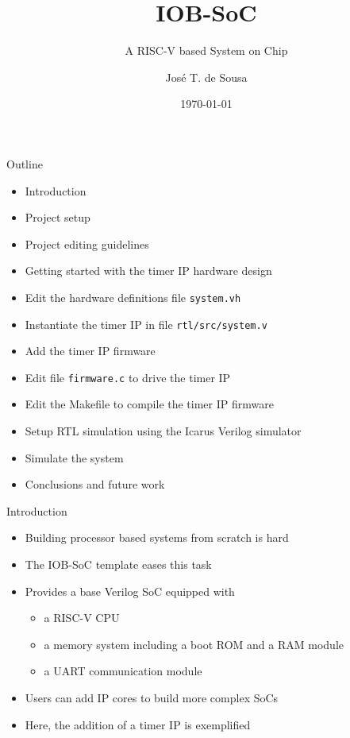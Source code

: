 \documentclass [xcolor=svgnames, t] {beamer}
\title[IOB-SoC Presentation]{IOB-SoC}
\subtitle{A RISC-V based System on Chip}
\institute[IObundle Lda]{IObundle Lda.\\The Architecture for an Agile World}
\author[José T. de Sousa]{Jos\'e T. de Sousa}
\institute[IObundle Lda]{IObundle Lda}
\date{\today}
\begin{document}
\begin{frame}
 \titlepage   
\end{frame}


\begin{frame}{Outline}
\begin{center}
   \begin{itemize}
     \item Introduction
     \item Project setup
     \item Project editing guidelines
     \item Getting started with the timer IP hardware design
     \item Edit the hardware definitions file {\tt system.vh}
     \item Instantiate the timer IP in file {\tt rtl/src/system.v}
     \item Add the timer IP firmware
     \item Edit file {\tt firmware.c} to drive the timer IP
     \item Edit the Makefile to compile the timer IP firmware
     \item Setup RTL simulation using the Icarus Verilog simulator
     \item Simulate the system
     \item Conclusions and future work
 \end{itemize} 
\end{center}
\end{frame}


\begin{frame}{Introduction}
\begin{center}
    \begin{itemize}
      \item Building processor based systems from scratch is hard
      \item The IOB-SoC template eases this task
      \item Provides a base Verilog SoC equipped with
        \begin{itemize}
        \item a RISC-V CPU
        \item a memory system including a boot ROM and a RAM module
        \item a UART communication module
        \end{itemize}
      \item Users can add IP cores to build more complex SoCs
      \item Here, the addition of a timer IP is exemplified
    \end{itemize}
\end{center}
\end{frame}
\end{document}
